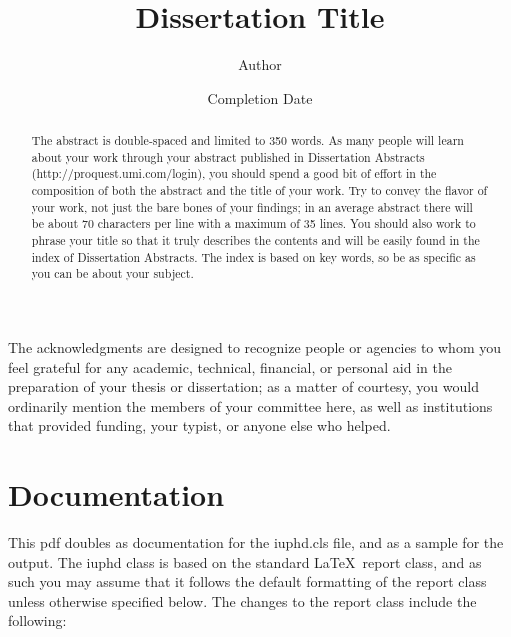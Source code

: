 \documentclass{iuphd}
\title{Dissertation Title}
\author{Author}
\date{Completion Date}
\begin{document}
\maketitle

\acceptancepage

\copyrightpage


\begin{acknowledgments}
The acknowledgments are designed to recognize people or agencies to whom you feel grateful for any academic,
technical, financial, or personal aid in the preparation of your thesis or dissertation; as a matter of
courtesy, you would ordinarily mention the members of your committee here, as well as institutions that
provided funding, your typist, or anyone else who helped.
\end{acknowledgments}


\begin{abstract}
 The abstract is double-spaced and limited to 350 words. As many people will learn about
your work through your abstract published in Dissertation Abstracts (http://proquest.umi.com/login),
you should spend a good bit of effort in the composition of both the abstract and the title of your work.
Try to convey the flavor of your work, not just the bare bones of your findings; in an average abstract
there will be about 70 characters per line with a maximum of 35 lines. You should also work to phrase your
title so that it truly describes the contents and will be easily found in the index of Dissertation Abstracts.
The index is based on key words, so be as specific as you can be about your subject. 
\end{abstract}

\tableofcontents

\chapter{Documentation}

This pdf doubles as documentation for the iuphd.cls file, and as a sample for the output.
The iuphd class is based on the standard \LaTeX \ report class, and as such you may assume that it follows
the default formatting of the report class unless otherwise specified below.  The
changes to the report class include the following:
\end{document}
